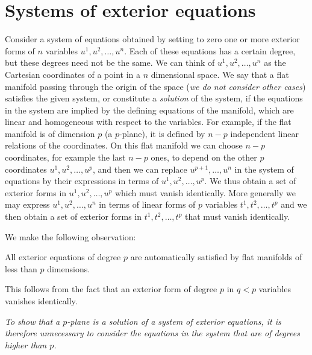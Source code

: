 \section{Systems of exterior equations}
\label{sec:syst-exter-equat}

\fsec Consider a system of equations obtained by setting to zero one or more exterior forms of $n$ variables $u^{1},u^{2},\dots,u^{n}$. Each of these equations has a certain degree, but these degrees need not be the same. We can think of $u^{1},u^{2},\dots,u^{n}$ as the Cartesian coordinates of a point in a $n$ dimensional space. We say that a flat manifold passing through the origin of the space (\emph{we do not consider other cases}) satisfies the given system, or constitute a \emph{solution} of the system, if the equations in the system are implied by the defining equations of the manifold, which are linear and homogeneous with respect to the variables. For example, if the flat manifold is of dimension $p$ (a $p$-plane), it is defined by $n-p$ independent linear relations of the coordinates. On this flat manifold we can choose $n-p$ coordinates, for example the last $n-p$ ones, to depend on the other $p$ coordinates $u^{1},u^{2},\dots,u^{p}$, and then we can replace $u^{p+1},\dots,u^{n}$ in the system of equations by their expressions in terms of $u^{1},u^{2},\dots,u^{p}$. We thus obtain a set of exterior forms in $u^{1},u^{2},\dots,u^{p}$ which must vanish identically. More generally we may express $u^{1},u^{2},\dots,u^{n}$ in terms of linear forms of $p$ variables $t^{1},t^{2},\dots,t^{p}$ and we then obtain a set of exterior forms in $t^{1},t^{2},\dots,t^{p}$ that must vanish identically.

We make the following observation:
\begin{thm*}
  All exterior equations of degree $p$ are automatically satisfied by flat manifolds of less than $p$ dimensions.
\end{thm*}

This follows from the fact that an exterior form of degree $p$ in $q<p$ variables vanishes identically.

\emph{To show that a $p$-plane is a solution of a system of exterior equations, it is therefore unnecessary to consider the equations in the system that are of degrees higher  than $p$.}

